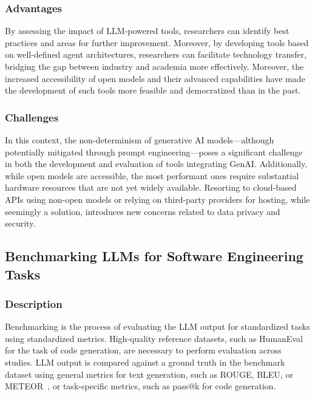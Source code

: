 \subsubsection{Advantages}

By assessing the impact of LLM-powered tools, researchers can identify best practices and areas for further improvement.
Moreover, by developing tools based on well-defined agent architectures, researchers can facilitate technology transfer, bridging the gap between industry and academia more effectively. 
Moreover, the increased accessibility of open models and their advanced capabilities have made the development of such tools more feasible and democratized than in the past.

\subsubsection{Challenges}


In this context, the non-determinism of generative AI models—although potentially mitigated through prompt engineering—poses a significant challenge in both the development and evaluation of tools integrating GenAI. 
Additionally, while open models are accessible, the most performant ones require substantial hardware resources that are not yet widely available. Resorting to cloud-based APIs using non-open models or relying on third-party providers for hosting, while seemingly a solution, introduces new concerns related to data privacy and security.

\subsection{Benchmarking LLMs for Software Engineering Tasks}

\subsubsection{Description}

Benchmarking is the process of evaluating the LLM output for standardized tasks using standardized metrics.
High-quality reference datasets, such as HumanEval~\cite{DBLP:journals/corr/abs-2107-03374} for the task of code generation, are necessary to perform evaluation across studies.
LLM output is compared against a ground truth in the benchmark dataset using general metrics for text generation, such as ROUGE, BLEU, or METEOR~\cite{10.1145/3695988}, or task-specific metrics, such as pass@k for code generation.

